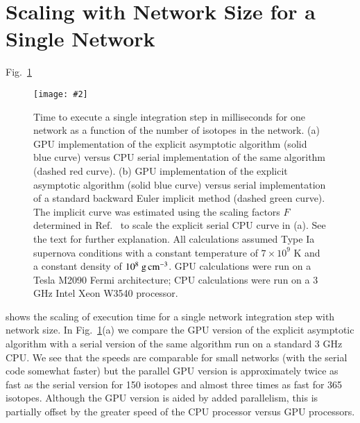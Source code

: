 \documentclass[]{elsart}
\newlength{\figdn}
\newcommand{\fig}[1]{Fig.~\ref{fig:#1}}
\newcommand{\units}[1]{\mbox{\ #1}}
\newcommand{\singlefig}[6]{%
\begin{figure} \vspace{#3}%
\begin{flushright}%
\texttt{[image: \#2]}%
\end{flushright}%
\caption{\label{fig:#1} #6}%
\vspace{#4}%
\end{figure}}
\begin{document}
\section{Scaling with Network Size for a Single Network}

 \fig{scaling_isotopes2}%
%
%
\singlefig
{scaling_isotopes2}
{figures/scaling_isotopes2.eps}
{0pt}
{\figdn}
{0.60}
{Time to execute a single integration step in milliseconds for one network as a 
function of the number of isotopes in the network.   (a) GPU implementation of 
the explicit asymptotic algorithm (solid blue curve) versus CPU serial 
implementation of the same algorithm (dashed red curve). (b) GPU implementation 
of the explicit asymptotic algorithm (solid blue curve) versus serial 
implementation of a standard backward Euler implicit method (dashed green 
curve). The implicit curve was estimated using the scaling factors $F$ 
determined in Ref.\ \cite{guidAsy} to scale the explicit serial CPU curve in 
(a). See the text for further explanation. All calculations assumed Type Ia 
supernova conditions with a constant temperature of $7\times 10^9$ K and a 
constant density of $10^8 \units{g\,cm}^{-3}$.  GPU calculations were run on 
a Tesla M2090 Fermi architecture; CPU calculations were run on a 3 GHz Intel 
Xeon W3540 processor.}
%
%
shows the scaling of execution time for a single network integration step 
with network size.  In \fig{scaling_isotopes2}(a) we compare the GPU version of 
the explicit asymptotic algorithm with a serial version of the same algorithm 
run on a standard 3 GHz CPU.  We see that the speeds are comparable for small 
networks (with the serial code somewhat faster) but the parallel GPU version is 
approximately twice as fast as the serial version for 150 isotopes and almost 
three times as fast for 365 isotopes.  Although the GPU version is aided by 
added parallelism, this is partially offset by the greater speed of the CPU 
processor versus GPU processors.  
\end{document}
